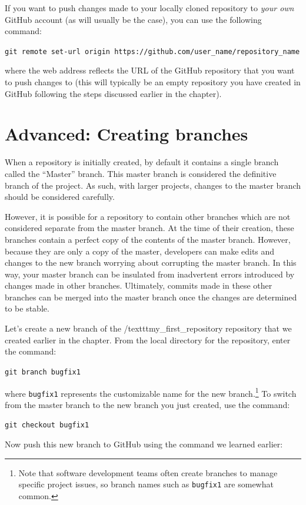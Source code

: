 \documentclass{book}
\begin{document}
If you want to push changes made to your locally cloned repository to \textit{your own} GitHub account (as will usually be the case), you can use the following command:

\texttt{git remote set-url origin https://github.com/user\_name/repository\_name}

where the web address reflects the URL of the GitHub repository that you want to push changes to (this will typically be an empty repository you have created in GitHub following the steps discussed earlier in the chapter).

\section{Advanced: Creating branches}
When a repository is initially created, by default it contains a single branch called the ``Master'' branch. This master branch is considered the definitive branch of the project. As such, with larger projects, changes to the master branch should be considered carefully.

However, it is possible for a repository to contain other branches which are not considered separate from the master branch. At the time of their creation, these branches contain a perfect copy of the contents of the master branch. However, because they are only a copy of the master, developers can make edits and changes to the new branch worrying about corrupting the master branch. In this way, your master branch can be insulated from inadvertent errors introduced by changes made in other branches. Ultimately, commits made in these other branches can be merged into the master branch once the changes are determined to be stable.

Let's create a new branch of the /texttt{my\_first\_repository} repository that we created earlier in the chapter. From the local directory for the repository, enter the command:

\texttt{git branch bugfix1}

where \texttt{bugfix1} represents the customizable name for the new branch.\footnote{Note that software development teams often create branches to manage specific project issues, so branch names such as \texttt{bugfix1} are somewhat common.} To switch from the master branch to the new branch you just created, use the command:

\texttt{git checkout bugfix1}

Now push this new branch to GitHub using the command we learned earlier:
\end{document}
